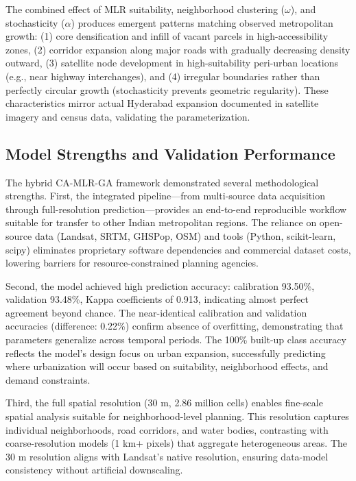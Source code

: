 \documentclass[12pt,a4paper]{article}
\begin{document}
The combined effect of MLR suitability, neighborhood clustering ($\omega$), and stochasticity ($\alpha$) produces emergent patterns matching observed metropolitan growth: (1) core densification and infill of vacant parcels in high-accessibility zones, (2) corridor expansion along major roads with gradually decreasing density outward, (3) satellite node development in high-suitability peri-urban locations (e.g., near highway interchanges), and (4) irregular boundaries rather than perfectly circular growth (stochasticity prevents geometric regularity). These characteristics mirror actual Hyderabad expansion documented in satellite imagery and census data, validating the parameterization.


\subsection{Model Strengths and Validation Performance}

The hybrid CA-MLR-GA framework demonstrated several methodological strengths. First, the integrated pipeline—from multi-source data acquisition through full-resolution prediction—provides an end-to-end reproducible workflow suitable for transfer to other Indian metropolitan regions. The reliance on open-source data (Landsat, SRTM, GHSPop, OSM) and tools (Python, scikit-learn, scipy) eliminates proprietary software dependencies and commercial dataset costs, lowering barriers for resource-constrained planning agencies.

Second, the model achieved high prediction accuracy: calibration 93.50\%, validation 93.48\%, Kappa coefficients of 0.913, indicating almost perfect agreement beyond chance. The near-identical calibration and validation accuracies (difference: 0.22\%) confirm absence of overfitting, demonstrating that parameters generalize across temporal periods. The 100\% built-up class accuracy reflects the model's design focus on urban expansion, successfully predicting where urbanization will occur based on suitability, neighborhood effects, and demand constraints.

Third, the full spatial resolution (30 m, 2.86 million cells) enables fine-scale spatial analysis suitable for neighborhood-level planning. This resolution captures individual neighborhoods, road corridors, and water bodies, contrasting with coarse-resolution models (1 km+ pixels) that aggregate heterogeneous areas. The 30 m resolution aligns with Landsat's native resolution, ensuring data-model consistency without artificial downscaling.
\end{document}
